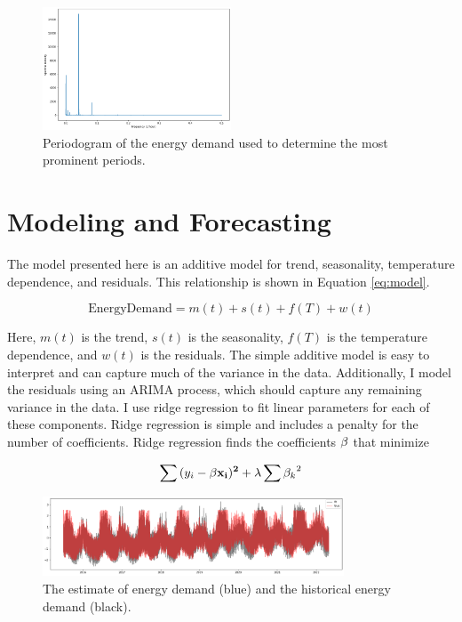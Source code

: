 \documentclass[12pt]{article}
\begin{document}
\begin{figure}[h!]
    \centering
    \includegraphics[width=0.5\textwidth]{figures/periodogram.png}
    \caption{Periodogram of the energy demand used to determine the most prominent periods.}
    \label{fig:periodogram}
\end{figure}

\section*{Modeling and Forecasting} 

The model presented here is an additive model for trend, seasonality, temperature dependence, and residuals. This relationship is shown in Equation \ref{eq:model}.

\begin{equation}
    \text{EnergyDemand} = m(t) + s(t) + f(T) + w(t)
    \label{eq:model}
\end{equation}

Here, $m(t)$ is the trend, $s(t)$ is the seasonality, $f(T)$ is the temperature dependence, and $w(t)$ is the residuals. The simple additive model is easy to interpret and can capture much of the variance in the data. Additionally, I model the residuals using an ARIMA process, which should capture any remaining variance in the data. I use ridge regression to fit linear parameters for each of these components. Ridge regression is simple and includes a penalty for the number of coefficients. Ridge regression finds the coefficients $\bf{\beta}$ that minimize

\begin{equation*}
    \sum{(y_i - \bf{\beta}x_i)^2} + \lambda \sum{\beta_k}^2 
\end{equation*}

\begin{figure}[h]
    \centering
    \includegraphics[width=0.8\textwidth]{figures/model_fit.png}
    \caption{The estimate of energy demand (blue) and the historical energy demand (black).}
    \label{fig:model_fit}
\end{figure}
\end{document}
